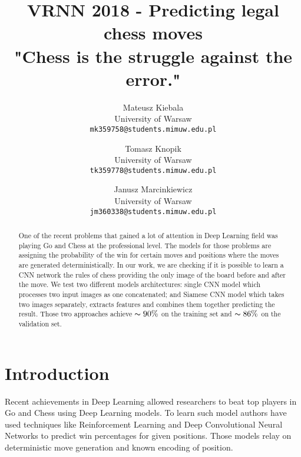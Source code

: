 \documentclass[10pt,twocolumn,letterpaper]{article}
\begin{document}
\title{VRNN 2018 - Predicting legal chess moves \\ \large {\small "Chess is the struggle against the error."} }


\author{Mateusz Kiebala\\
University of Warsaw\\
{\tt\small mk359758@students.mimuw.edu.pl}
\and
Tomasz Knopik\\
University of Warsaw\\
{\tt\small tk359778@students.mimuw.edu.pl}
\and
Janusz Marcinkiewicz\\
University of Warsaw\\
{\tt\small jm360338@students.mimuw.edu.pl}}

\maketitle

\begin{abstract}
   One of the recent problems that gained a lot of attention in Deep Learning
   field was playing Go and Chess at the professional level. The models for
   those problems are assigning the probability of the win for certain moves and
   positions where the moves are generated deterministically. In our work, we
   are checking if it is possible to learn a CNN network the rules of chess
   providing the only image of the board before and after the move. We test two
   different models architectures: single CNN model which processes two input
   images as one concatenated; and Siamese CNN model which takes two images
   separately, extracts features and combines them together predicting the
   result. Those two approaches achieve $\thicksim 90\%$ on the training set and
   $\thicksim 86\%$ on the validation set.
\end{abstract}

\section{Introduction}

Recent achievements in Deep Learning allowed researchers to beat top players in
Go and Chess using Deep Learning models\cite{silver2017mastering}. To learn such
model authors have used techniques like Reinforcement Learning and Deep
Convolutional Neural Networks to predict win percentages for given positions.
Those models relay on deterministic move generation and known encoding of
position.
\end{document}
